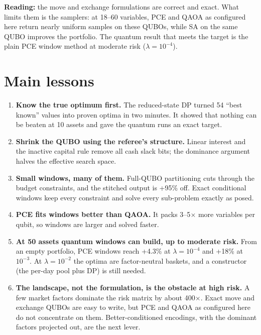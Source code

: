 \documentclass[11pt]{article}
\begin{document}
\noindent\textbf{Reading:} the move and exchange formulations are correct and exact. What limits them
is the samplers: at 18--60 variables, PCE and QAOA as configured here return nearly uniform samples on
these QUBOs, while SA on the same QUBO improves the portfolio. The quantum result that meets the target
is the plain PCE window method at moderate risk ($\lambda=10^{-4}$).

\section{Main lessons}
\begin{enumerate}
\item \textbf{Know the true optimum first.} The reduced-state DP turned 54 ``best known'' values into
  proven optima in two minutes. It showed that nothing can be beaten at 10 assets and gave the quantum
  runs an exact target.
\item \textbf{Shrink the QUBO using the referee's structure.} Linear interest and the inactive capital
  rule remove all cash slack bits; the dominance argument halves the effective search space.
\item \textbf{Small windows, many of them.} Full-QUBO partitioning cuts through the budget
  constraints, and the stitched output is +95\% off. Exact conditional windows keep every
  constraint and solve every sub-problem exactly as posed.
\item \textbf{PCE fits windows better than QAOA.} It packs 3--5$\times$ more variables per qubit,
  so windows are larger and solved faster.
\item \textbf{At 50 assets quantum windows can build, up to moderate risk.} From an empty portfolio,
  PCE windows reach +4.3\% at $\lambda=10^{-4}$ and +18\% at $10^{-3}$. At $\lambda=10^{-2}$ the
  optima are factor-neutral baskets, and a constructor (the per-day pool plus DP) is still needed.
\item \textbf{The landscape, not the formulation, is the obstacle at high risk.} A few market factors
  dominate the risk matrix by about 400$\times$. Exact move and exchange QUBOs are easy to write, but
  PCE and QAOA as configured here do not concentrate on them. Better-conditioned encodings, with the
  dominant factors projected out, are the next lever.
\end{enumerate}
\end{document}
